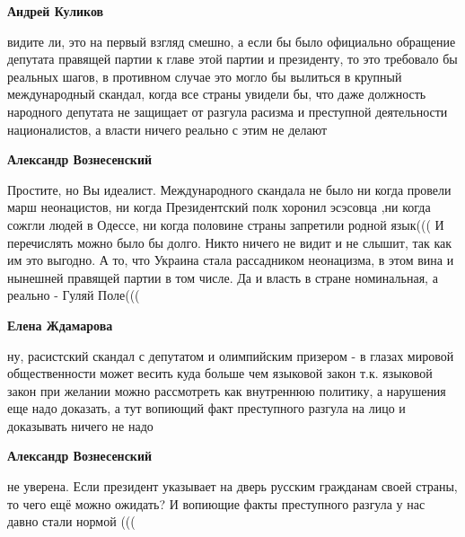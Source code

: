 \begin{itemize}
\begin{itemize}
\textbf{Андрей Куликов} 

видите ли, это на первый взгляд смешно, а если бы было
официально обращение депутата правящей партии к главе этой партии и президенту,
то это требовало бы реальных шагов, в противном случае это могло бы вылиться в
крупный международный скандал, когда все страны увидели бы, что даже должность
народного депутата не защищает от разгула расизма и преступной деятельности
националистов, а власти ничего реально с этим не делают


\textbf{Александр Вознесенский} 

Простите, но Вы идеалист. Международного
скандала не было ни когда провели марш неонацистов, ни когда Президентский полк
хоронил эсэсовца ,ни когда сожгли людей в Одессе, ни когда половине страны
запретили родной язык((( И перечислять можно было бы долго. Никто ничего не
видит и не слышит, так как им это выгодно. А то, что Украина стала рассадником
неонацизма, в этом вина и нынешней правящей партии в том числе. Да и власть в
стране номинальная, а реально - Гуляй Поле(((

 
\textbf{Елена Ждамарова} 

ну, расистский скандал с депутатом и олимпийским призером - в глазах мировой
общественности может весить куда больше чем языковой закон т.к. языковой закон
при желании можно рассмотреть как внутреннюю политику, а нарушения еще надо
доказать, а тут вопиющий факт преступного разгула на лицо и доказывать ничего
не надо

 
\textbf{Александр Вознесенский} 

не уверена. Если президент указывает на дверь
русским гражданам своей страны, то чего ещё можно ожидать? И вопиющие факты
преступного разгула у нас давно стали нормой (((


\end{itemize}
\end{itemize}
